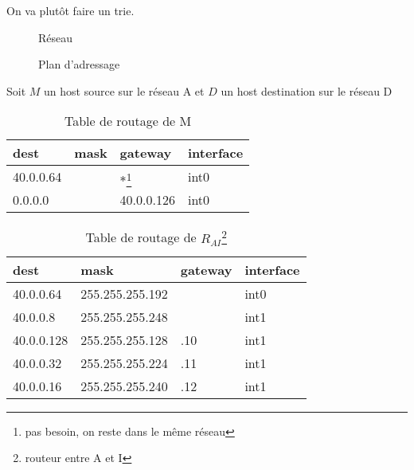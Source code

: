 \documentclass{article}
\begin{document}
   On va plutôt faire un trie.

   \begin{figure}[H]
       \centering
       
       \caption{Réseau}
       \label{fig:reseau}
   \end{figure}

    \begin{figure}[H]
        \centering
        \caption{Plan d'adressage}
        \label{fig:plan-adressage}
    \end{figure}

    Soit $M$ un host source sur le réseau A et $D$ un host destination sur le réseau D

   \begin{table}[H]
       \centering
       \caption{Table de routage de M}
       \label{tab:table-routage}
       \begin{tabular}{llll}
       dest & mask & gateway & interface \\\hline
       40.0.0.64 & & $\ast$\footnote{pas besoin, on reste dans le même réseau} & int0 \\
       0.0.0.0 & & 40.0.0.126 & int0 \\
       \end{tabular}
   \end{table}

   \begin{table}[H]
       \centering
       \caption{Table de routage de $R_{AI}$\footnote{routeur entre A et I}}
       \label{tab:routage-RAI}
       \begin{tabular}{llll}
           dest & mask & gateway & interface \\\hline
           40.0.0.64 & 255.255.255.192 & & int0 \\
           40.0.0.8 & 255.255.255.248 & & int1 \\
           40.0.0.128 & 255.255.255.128 & .10 & int1 \\
           40.0.0.32 & 255.255.255.224 & .11 & int1 \\
           40.0.0.16 & 255.255.255.240 & .12 & int1 \\
       \end{tabular}
   \end{table}
\end{document}
